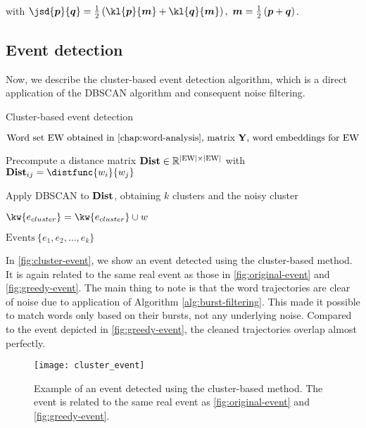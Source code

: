 with $\jsd{\vect{p}}{\vect{q}} = \frac{1}{2} \left( \kl{\vect{p}}{\vect{m}} + \kl{\vect{q}}{\vect{m}} \right) ,\ \vect{m} = \frac{1}{2} \left( \vect{p} + \vect{q} \right)$.


\subsection{Event detection}
Now, we describe the cluster-based event detection algorithm, which is a direct application of the DBSCAN algorithm and consequent noise filtering.

\begin{algorithm}[H]
\begin{algorithmic}[1]
\caption{Cluster-based event detection}
\Input $\text{Word set EW obtained in \autoref{chap:word-analysis}, matrix } \trajmat \text{, word embeddings for EW}$

\State Precompute a distance matrix $\mathbf{Dist} \in \mathbb{R}^{\left\vert \text{EW} \right\vert \times \left\vert \text{EW} \right\vert}$ with $\distmat_{ij} = \distfunc{w_{i}}{w_{j}}$

\State Apply DBSCAN to $\mathbf{Dist}$, obtaining $k$ clusters and the noisy cluster

		\State $\kw{e_{cluster}} = \kw{e_{cluster}} \cup w$
	\EndIf
\EndFor

\Output $\text{Events} ~ \{ e_{1}, e_{2}, \dots, e_{k} \}$
\end{algorithmic}
\end{algorithm}

In \autoref{fig:cluster-event}, we show an event detected using the cluster-based method. It is again related to the same real event as those in \autoref{fig:original-event} and \autoref{fig:greedy-event}. The main thing to note is that the word trajectories are clear of noise due to application of Algorithm \ref{alg:burst-filtering}. This made it possible to match words only based on their bursts, not any underlying noise. Compared to the event depicted in \autoref{fig:greedy-event}, the cleaned trajectories overlap almost perfectly.

\begin{figure}
  \centering
  \texttt{[image: cluster\_event]}  %
  \caption{Example of an event detected using the cluster-based method. The event is related to the same real event as \autoref{fig:original-event} and \autoref{fig:greedy-event}.}
  \label{fig:cluster-event}
\end{figure}
